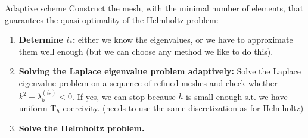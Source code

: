\documentclass[]{beamer}
\newcommand{\oxarrow}{\color{oxfordblue}$\blacktriangleright$}
\begin{document}
	\begin{frame}{Adaptive scheme}
	\vspace{1cm}
	Construct the mesh, with the minimal number of elements, that guarantees the quasi-optimality of the Helmholtz problem:
	\begin{enumerate}
		\item<2->[\oxarrow] \textbf{Determine $i_{\ast}$:} either we know the eigenvalues, or we have to approximate them well enough (but we can choose any method we like to do this). 
		\item<3->[\oxarrow] \textbf{Solving the Laplace eigenvalue problem adaptively:} Solve the Laplace eigenvalue problem on a sequence of refined meshes and check whether $k^2 - \lambda_h^{(i_{\ast})} < 0$. If yes, we can stop because $h$ is small enough s.t. we have uniform T$_h$-coercivity. (needs to use the same discretization as for Helmholtz)
		\item<4->[\oxarrow] \textbf{Solve the Helmholtz problem.}
	\end{enumerate}
	\end{frame}
\end{document}
